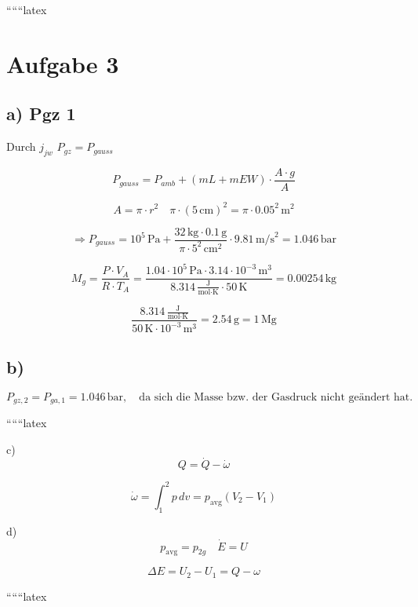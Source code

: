 
``````latex


\section*{Aufgabe 3}

\subsection*{a) Pgz 1}

Durch $j_{jw}$ \quad $P_{gz} = P_{gauss}$

\[
P_{gauss} = P_{amb} + (mL + mEW) \cdot \frac{A \cdot g}{A}
\]

\[
A = \pi \cdot r^2 \quad \pi \cdot (5 \, \text{cm})^2 = \pi \cdot 0.05^2 \, \text{m}^2
\]

\[
\Rightarrow P_{gauss} = 10^5 \, \text{Pa} + \frac{32 \, \text{kg} \cdot 0.1 \, \text{g}}{\pi \cdot 5^2 \, \text{cm}^2} \cdot 9.81 \, \text{m/s}^2 = 1.046 \, \text{bar}
\]

\[
M_g = \frac{P \cdot V_A}{R \cdot T_A} = \frac{1.04 \cdot 10^5 \, \text{Pa} \cdot 3.14 \cdot 10^{-3} \, \text{m}^3}{8.314 \, \frac{\text{J}}{\text{mol} \cdot \text{K}} \cdot 50 \, \text{K}} = 0.00254 \, \text{kg}
\]

\[
\frac{8.314 \, \frac{\text{J}}{\text{mol} \cdot \text{K}}}{50 \, \text{K} \cdot 10^{-3} \, \text{m}^3} = 2.54 \, \text{g} = 1 \, \text{Mg}
\]

\subsection*{b)}

\[
P_{gz,2} = P_{ga,1} = 1.046 \, \text{bar}, \quad \text{da sich die Masse bzw. der Gasdruck nicht geändert hat.}
\]

``````latex

c)
\[
Q = \dot{Q} - \dot{\omega}
\]

\[
\dot{\omega} = \int_{1}^{2} p \, dv = p_{\text{avg}} (V_2 - V_1)
\]

d)
\[
p_{\text{avg}} = p_{2g} \quad \dot{E} = U
\]

\[
\Delta E = U_2 - U_1 = Q - \omega
\]

``````latex



